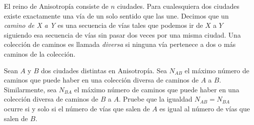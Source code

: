 \begin{probMB}
  El reino de Anisotropía consiste de $n$ ciudades. Para cualesquiera dos
  ciudades existe exactamente una vía de un solo sentido que las une. Decimos
  que un \emph{camino de X a Y} es una secuencia de vías tales que podemos ir de
  $X$ a $Y$ siguiendo esa secuencia de vías sin pasar dos veces por una misma
  ciudad. Una colección de caminos es llamada \emph{diversa} si ninguna vía
  pertenece a dos o más caminos de la colección.

  Sean $A$ y $B$ dos ciudades distintas en Anisotropía. Sea $N_{AB}$ el máximo
  número de caminos que puede haber en una colección diversa de caminos de $A$ a
  $B$. Similarmente, sea $N_{BA}$ el máximo número de caminos que puede haber en
  una colección diversa de caminos de $B$ a $A$. Pruebe que la igualdad
  $N_{AB}=N_{BA}$ ocurre si y solo si el número de vías que salen de $A$ es
  igual al número de vías que salen de $B$.
\end{probMB}

